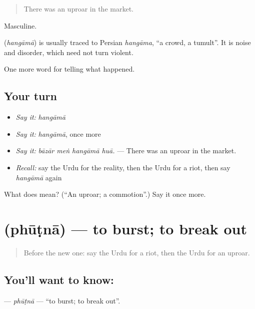\begin{quote}
There was an uproar in the market.
\end{quote}

Masculine.

\begin{cousinweb}
\textbf{} (\emph{hangāmā}) is usually traced to Persian \emph{hangāma}, \textquotedblleft{}a crowd, a tumult\textquotedblright{}. It is noise and disorder, which need not turn violent.
\end{cousinweb}

\begin{grammarlens}[title={What you've built}]
One more word for telling what happened.
\end{grammarlens}

\subsection*{Your turn}
\begin{itemize}
\raggedright
  \item \emph{Say it:} \emph{hangāmā}
  \item \emph{Say it:} \emph{hangāmā}, once more
  \item \emph{Say it:} \emph{bāzār meṅ hangāmā huā.} — There was an uproar in the market.
  \item \emph{Recall:} say the Urdu for the reality, then the Urdu for a riot, then say \emph{hangāmā} again
\end{itemize}

\begin{tcolorbox}[breakable,colback=teal!4,colframe=teal!35!black,title={Before you move on}]
What does  mean? (\textquotedblleft{}An uproar; a commotion\textquotedblright{}.) Say it once more.
\end{tcolorbox}
\section[\texorpdfstring{\ur{پھوٹنا} (phūṭnā)}{پھوٹنا (phūṭnā)}]{ (phūṭnā) — to burst; to break out}

\label{lesson:UR-C304-phutna}



\begin{quote}
Before the new one: say the Urdu for a riot, then the Urdu for an uproar.
\end{quote}

\subsection*{You'll want to know: }
\textbf{} — \emph{phūṭnā} — \textquotedblleft{}to burst; to break out\textquotedblright{}.

